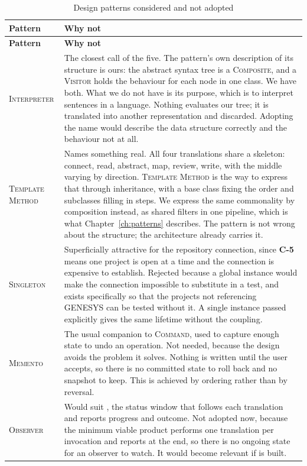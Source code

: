 \begin{longtable}{L{0.19\textwidth}L{0.73\textwidth}}
	\caption{Design patterns considered and not adopted}\label{tab:rejected-patterns}\\
	\toprule
	\textbf{Pattern} & \textbf{Why not} \\
	\midrule
	\endfirsthead
	\toprule
	\textbf{Pattern} & \textbf{Why not} \\
	\midrule
	\endhead

	\textsc{Interpreter} & The closest call of the five. The pattern's own
	description of its structure is ours: the abstract syntax tree is a
	\textsc{Composite}, and a \textsc{Visitor} holds the behaviour for each
	node in one class. We have both. What we do not have is its purpose, which
	is to interpret sentences in a language. Nothing evaluates our tree; it is
	translated into another representation and discarded. Adopting the name
	would describe the data structure correctly and the behaviour not at
	all. \\
	\addlinespace
	\textsc{Template Method} & Names something real. All four translations
	share a skeleton: connect, read, abstract, map, review, write, with the
	middle varying by direction. \textsc{Template Method} is the way to express
	that through inheritance, with a base class fixing the order and subclasses
	filling in steps. We express the same commonality by composition instead,
	as shared filters in one pipeline, which is what
	Chapter~\ref{ch:patterns} describes. The pattern is not wrong about the
	structure; the architecture already carries it. \\
	\addlinespace
	\textsc{Singleton} & Superficially attractive for the repository
	connection, since \textbf{C-5} means one project is open at a time and the
	connection is expensive to establish. Rejected because a global instance
	would make the connection impossible to substitute in a test, and
	 exists specifically so that the projects not referencing
	GENESYS can be tested without it. A single instance passed explicitly gives
	the same lifetime without the coupling. \\
	\addlinespace
	\textsc{Memento} & The usual companion to \textsc{Command}, used to capture
	enough state to undo an operation. Not needed, because the design avoids
	the problem it solves. Nothing is written until the user accepts, so there
	is no committed state to roll back and no snapshot to keep. This is
	 achieved by ordering rather than by reversal. \\
	\addlinespace
	\textsc{Observer} & Would suit , the status window that follows
	each translation and reports progress and outcome. Not adopted now, because
	the minimum viable product performs one translation per invocation and
	reports at the end, so there is no ongoing state for an observer to watch.
	It would become relevant if  is built. \\
	\bottomrule
\end{longtable}

